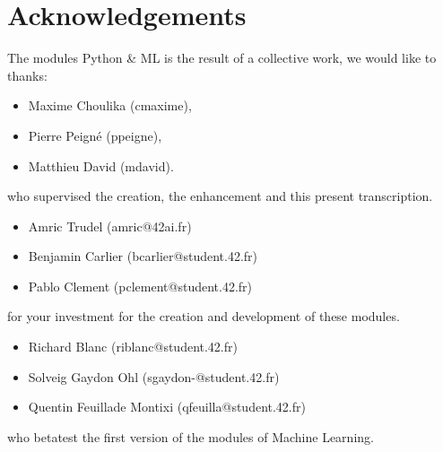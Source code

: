 \documentclass{42-en}
\begin{document}
\section*{Acknowledgements}
The modules Python \& ML is the result of a collective work, we would like to thanks:
\begin{itemize}
  \item Maxime Choulika (cmaxime),
  \item Pierre Peigné (ppeigne),
  \item Matthieu David (mdavid).
\end{itemize}
who supervised the creation, the enhancement and this present transcription.

\begin{itemize}
  \item Amric Trudel (amric@42ai.fr)
  \item Benjamin Carlier (bcarlier@student.42.fr)
  \item Pablo Clement (pclement@student.42.fr)
\end{itemize}
for your investment for the creation and development of these modules.

\begin{itemize}
  \item Richard Blanc (riblanc@student.42.fr)
  \item Solveig Gaydon Ohl (sgaydon-@student.42.fr)
  \item Quentin Feuillade Montixi (qfeuilla@student.42.fr)
\end{itemize}
who betatest the first version of the modules of Machine Learning.
\vfill
\doclicenseThis
\end{document}
